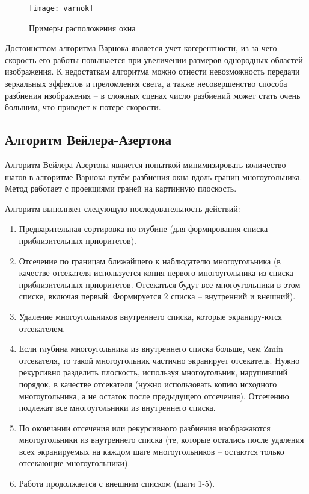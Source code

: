 \documentclass[12pt,a4paper,oneside]{report}
\begin{document}
	\begin{figure}[h]
		\centering
		\texttt{[image: varnok]}
		\caption{Примеры расположения окна}
	\end{figure}

	Достоинством алгоритма Варнока является учет когерентности, из-за чего скорость его работы повышается при увеличении размеров однородных областей изображения. К недостаткам алгоритма можно отнести невозможность передачи зеркальных эффектов и преломления света, а также несовершенство способа разбиения изображения – в сложных сценах число разбиений может стать очень большим, что приведет к потере скорости.
	
	\subsection{Алгоритм Вейлера-Азертона}
	\quad Алгоритм Вейлера-Азертона является попыткой минимизировать количество шагов в алгоритме Варнока путём разбиения окна вдоль границ многоугольника. Метод работает с проекциями граней на картинную плоскость.
	
	Алгоритм выполняет следующую последовательность действий:
	\begin{enumerate}
		\item Предварительная сортировка по глубине (для формирования списка приблизительных приоритетов).
		\item Отсечение по границам ближайшего к наблюдателю многоугольника (в качестве отсекателя используется копия первого многоугольника из списка приблизительных приоритетов. Отсекаться будут все многоугольники в этом списке, включая первый. Формируется 2 списка – внутренний и внешний).
		\item Удаление многоугольников внутреннего списка, которые экраниру-ются отсекателем.
		\item Если глубина многоугольника из внутреннего списка больше, чем Zmin отсекателя, то такой многоугольник частично экранирует отсекатель. Нужно рекурсивно разделить плоскость, используя многоугольник, нарушивший порядок, в качестве отсекателя (нужно использовать копию исходного многоугольника, а не остаток после предыдущего отсечения). Отсечению подлежат все многоугольники из внутреннего списка.
		\item По окончании отсечения или рекурсивного разбиения изображаются многоугольники из внутреннего списка (те, которые остались после удаления всех экранируемых на каждом шаге многоугольников – остаются только отсекающие многоугольники).
		\item Работа продолжается с внешним списком (шаги 1-5).
	\end{enumerate}
	
\end{document}
